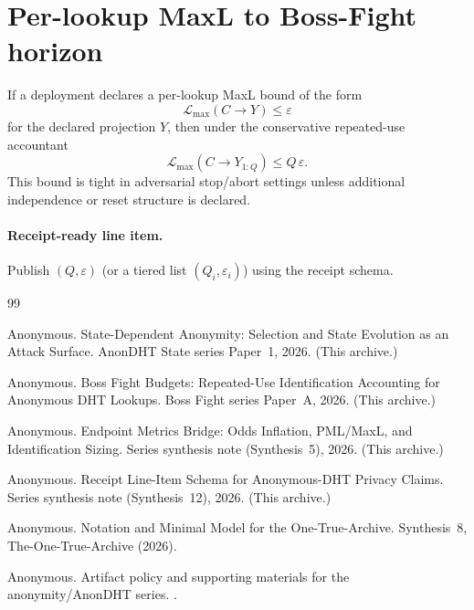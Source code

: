 \documentclass[11pt]{article}
\theoremstyle{definition}
\theoremstyle{remark}
\begin{document}
\section{Per-lookup MaxL to Boss-Fight horizon}

If a deployment declares a per-lookup MaxL bound of the form
\[
\mathcal{L}_{\max}(C\!\to\! Y)\le \varepsilon
\]
for the declared projection $Y$, then under the conservative repeated-use accountant
\[
\mathcal{L}_{\max}(C\!\to\! Y_{1:Q}) \le Q\,\varepsilon.
\]
This bound is tight in adversarial stop/abort settings unless additional independence or reset structure is declared.\cite{series:bossfightA}

\paragraph{Receipt-ready line item.}
Publish $(Q,\varepsilon)$ (or a tiered list $(Q_i,\varepsilon_i)$) using the receipt schema.\cite{series:receiptitems}

\begin{thebibliography}{99}

Anonymous.
\newblock State-Dependent Anonymity: Selection and State Evolution as an Attack Surface.
\newblock AnonDHT State series Paper~1, 2026. (This archive.)

Anonymous.
\newblock Boss Fight Budgets: Repeated-Use Identification Accounting for Anonymous DHT Lookups.
\newblock Boss Fight series Paper~A, 2026. (This archive.)

Anonymous.
\newblock Endpoint Metrics Bridge: Odds Inflation, PML/MaxL, and Identification Sizing.
\newblock Series synthesis note (Synthesis~5), 2026. (This archive.)

Anonymous.
\newblock Receipt Line-Item Schema for Anonymous-DHT Privacy Claims.
\newblock Series synthesis note (Synthesis~12), 2026. (This archive.)

Anonymous.
\newblock Notation and Minimal Model for the One-True-Archive.
\newblock Synthesis~8, The-One-True-Archive (2026).

Anonymous.
\newblock Artifact policy and supporting materials for the anonymity/AnonDHT series.
.
\end{thebibliography}
\end{document}
